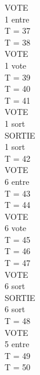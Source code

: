 \documentclass[12pt]{article} %
\begin{document}
\begin{multicols}{3}
{			\hspace*{5mm} VOTE\\
			\hspace*{12mm} 1 entre\\
			T = 37\\
			T = 38\\
			\hspace*{5mm} VOTE\\
			\hspace*{12mm} 1 vote\\
			T = 39\\
			T = 40\\
			T = 41\\
			\hspace*{5mm} VOTE\\
			\hspace*{12mm} 1 sort\\
			\hspace*{5mm} SORTIE\\
			\hspace*{12mm} 1 sort\\
			T = 42\\
			\hspace*{5mm} VOTE\\
			\hspace*{12mm} 6 entre\\
			T = 43\\
			T = 44\\
			\hspace*{5mm} VOTE\\
			\hspace*{12mm} 6 vote\\
			T = 45\\
			T = 46\\
			T = 47\\
			\hspace*{5mm} VOTE\\
			\hspace*{12mm} 6 sort\\
			\hspace*{5mm} SORTIE\\
			\hspace*{12mm} 6 sort\\
			T = 48\\
			\hspace*{5mm} VOTE\\
			\hspace*{12mm} 5 entre\\
			T = 49\\
			T = 50\\
}
\end{multicols}
\end{document}
